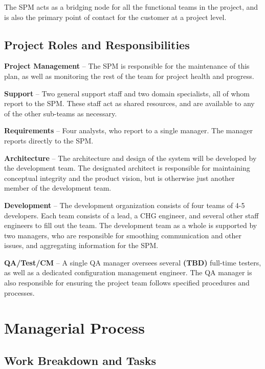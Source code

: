 \documentclass[11pt]{article}
\begin{document}
The SPM acts as a bridging node for all the functional teams in the project, and is also the primary
point of contact for the customer at a project level.  





\subsection{Project Roles and Responsibilities}

{\bf Project Management} -- The SPM is responsible for the maintenance of this plan, as well as
monitoring the rest of the team for project health and progress.

{\bf Support} -- Two general support staff and two domain specialists, all of whom report to the
SPM.  These staff act as shared resources, and are available to any of the other sub-teams as
necessary.

{\bf Requirements} -- Four analysts, who report to a single manager.  The manager reports directly
to the SPM.

{\bf Architecture} -- The architecture and design of the system will be developed by the development
team.  The designated architect is responsible for maintaining conceptual integrity and the product
vision, but is otherwise just another member of the development team.

{\bf Development} -- The development organization consists of four teams of 4-5 developers.  Each
team consists of a lead, a CHG engineer, and several other staff engineers to fill out the team.
The development team as a whole is supported by two managers, who are responsible for smoothing
communication and other issues, and aggregating information for the SPM.

{\bf QA/Test/CM} -- A single QA manager oversees several {\bf (TBD)} full-time testers, as well as a
dedicated configuration management engineer.  The QA manager is also responsible for ensuring the
project team follows specified procedures and processes.



\section{Managerial Process}

\subsection{Work Breakdown and Tasks}
\end{document}
